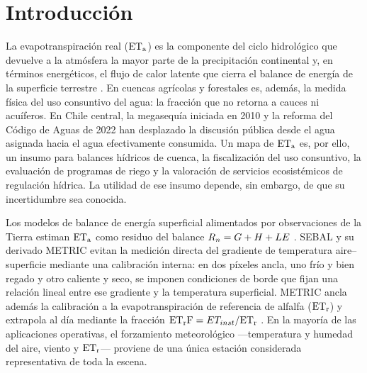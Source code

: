 \section{Introducción}\label{sec:intro}

La evapotranspiración real ($\mathrm{ET_a}$) es la componente del ciclo hidrológico
que devuelve a la atmósfera la mayor parte de la precipitación continental
y, en términos energéticos, el flujo de calor latente que cierra el balance
de energía de la superficie terrestre \parencite{fisher2017future}. En
cuencas agrícolas y forestales es, además, la medida física del uso
consuntivo del agua: la fracción que no retorna a cauces ni acuíferos. En
Chile central, la megasequía iniciada en 2010
\parencite{garreaud2017megadrought,garreaud2020megadrought} y la reforma del
Código de Aguas de 2022 \parencite{ley21435} han desplazado la discusión
pública desde el agua asignada hacia el agua efectivamente consumida. Un
mapa de $\mathrm{ET_a}$ es, por ello, un insumo para balances hídricos de cuenca, la
fiscalización del uso consuntivo, la evaluación de programas de riego y la
valoración de servicios ecosistémicos de regulación hídrica. La utilidad de
ese insumo depende, sin embargo, de que su incertidumbre sea conocida.

Los modelos de balance de energía superficial alimentados por observaciones
de la Tierra estiman $\mathrm{ET_a}$ como residuo del balance
$R_n = G + H + LE$ \parencite{kalma2008review}. SEBAL
\parencite{bastiaanssen1998sebal1,bastiaanssen1998sebal2} y su derivado
METRIC \parencite{allen2007metric1,allen2007metric2} evitan la medición
directa del gradiente de temperatura aire--superficie mediante una
calibración interna: en dos píxeles ancla, uno frío y bien regado y otro
caliente y seco, se imponen condiciones de borde que fijan una relación
lineal entre ese gradiente y la temperatura superficial. METRIC ancla además
la calibración a la evapotranspiración de referencia de alfalfa ($\mathrm{ET_r}$) y
extrapola al día mediante la fracción $\mathrm{ET_rF} = ET_{inst}/\mathrm{ET_r}$
\parencite{allen2007metric1,allen2011sebalmetric}. En la mayoría de las
aplicaciones operativas, el forzamiento meteorológico ---temperatura y
humedad del aire, viento y $\mathrm{ET_r}$--- proviene de una única estación
considerada representativa de toda la escena.

